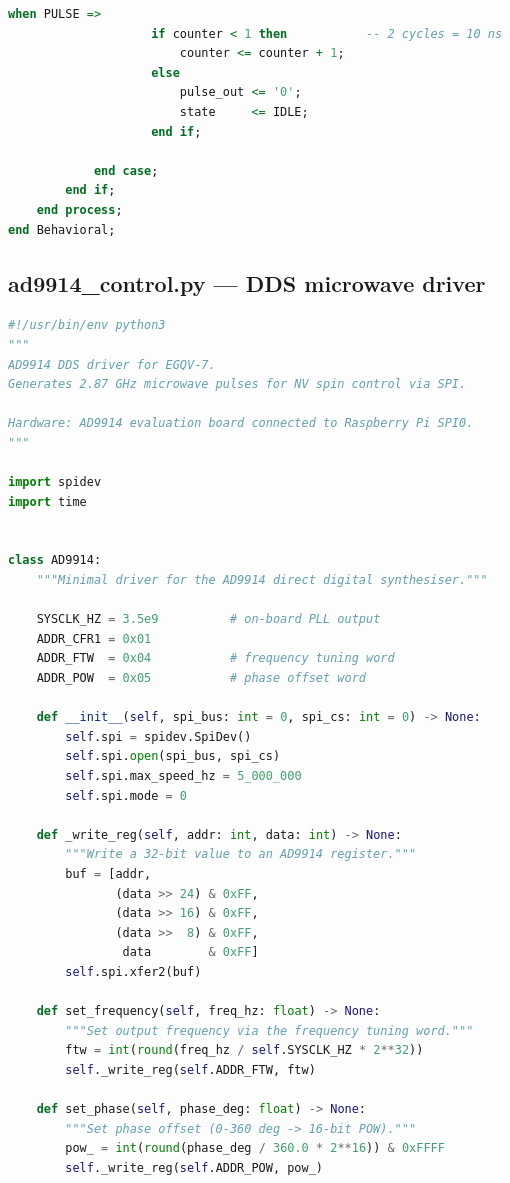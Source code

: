 \documentclass[12pt,a4paper]{article}
\begin{document}
\begin{lstlisting}[language=VHDL,caption={Feedback corrector: 100\,ns delay then 10\,ns correction pulse.}]
                when PULSE =>
                    if counter < 1 then           -- 2 cycles = 10 ns
                        counter <= counter + 1;
                    else
                        pulse_out <= '0';
                        state     <= IDLE;
                    end if;

            end case;
        end if;
    end process;
end Behavioral;
\end{lstlisting}

\subsection*{ad9914\_control.py --- DDS microwave driver}

\begin{lstlisting}[language=Python,caption={AD9914 SPI driver for 2.87\,GHz NV spin pulses.}]
#!/usr/bin/env python3
"""
AD9914 DDS driver for EGQV-7.
Generates 2.87 GHz microwave pulses for NV spin control via SPI.

Hardware: AD9914 evaluation board connected to Raspberry Pi SPI0.
"""

import spidev
import time


class AD9914:
    """Minimal driver for the AD9914 direct digital synthesiser."""

    SYSCLK_HZ = 3.5e9          # on-board PLL output
    ADDR_CFR1 = 0x01
    ADDR_FTW  = 0x04           # frequency tuning word
    ADDR_POW  = 0x05           # phase offset word

    def __init__(self, spi_bus: int = 0, spi_cs: int = 0) -> None:
        self.spi = spidev.SpiDev()
        self.spi.open(spi_bus, spi_cs)
        self.spi.max_speed_hz = 5_000_000
        self.spi.mode = 0

    def _write_reg(self, addr: int, data: int) -> None:
        """Write a 32-bit value to an AD9914 register."""
        buf = [addr,
               (data >> 24) & 0xFF,
               (data >> 16) & 0xFF,
               (data >>  8) & 0xFF,
                data        & 0xFF]
        self.spi.xfer2(buf)

    def set_frequency(self, freq_hz: float) -> None:
        """Set output frequency via the frequency tuning word."""
        ftw = int(round(freq_hz / self.SYSCLK_HZ * 2**32))
        self._write_reg(self.ADDR_FTW, ftw)

    def set_phase(self, phase_deg: float) -> None:
        """Set phase offset (0-360 deg -> 16-bit POW)."""
        pow_ = int(round(phase_deg / 360.0 * 2**16)) & 0xFFFF
        self._write_reg(self.ADDR_POW, pow_)


\end{lstlisting}
\end{document}
